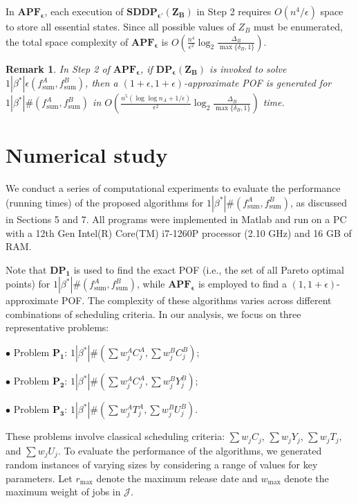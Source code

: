 \documentclass[12pt]{article}
\newtheorem{rem}{Remark}[section]
\begin{document}
\begin{sloppypar}
In $\mathbf{APF_{\epsilon}}$, each execution of $\mathbf{SDDP_{\epsilon'}(Z_B)}$ in Step 2 requires $O(n^4 /\epsilon)$ space to store all essential states. Since all possible values of $Z_B$ must be enumerated, the total space complexity of $\mathbf{APF_{\epsilon}}$ is $O(\frac{n^4}{\epsilon^2} \log_2 \frac{\Delta_B}{\max\{\delta_B,1\}})$.

\begin{rem} \label{R-7.3}
In Step 2 of $\mathbf{APF_{\epsilon}}$, if $\mathbf{DP_{\epsilon}(Z_B)}$ is invoked to solve $1 | \beta^{*}|\epsilon(f_{\mathrm{sum}}^A, f_{\mathrm{sum}}^B)$, then a $(1+\epsilon, 1+\epsilon)$-approximate POF is generated for $1 |\beta^{*}|\#(f_{\mathrm{sum}}^A, f_{\mathrm{sum}}^B)$ in $O(\frac{n^5(\log \log n_A+ 1/\epsilon)}{\epsilon^2} \log_2 \frac{\Delta_B}{\max\{\delta_B,1\}})$ time.
\end{rem}

\section{Numerical study}
We conduct a series of computational experiments to evaluate the performance (running times) of the proposed algorithms for $1 |\beta^{*}|\#(f_{\mathrm{sum}}^A, f_{\mathrm{sum}}^B)$, as discussed in Sections 5 and 7. All programs were implemented in Matlab and run on a PC with a 12th Gen Intel(R) Core(TM) i7-1260P processor (2.10 GHz) and 16 GB of RAM. 

Note that $\mathbf{DP_1}$ is used to find the exact POF (i.e., the set of all Pareto optimal points) for $1 | \beta^{*}|\#(f_{\mathrm{sum}}^A, f_{\mathrm{sum}}^B)$, while $\mathbf{APF_{\epsilon}}$ is employed to find a $(1, 1+\epsilon)$-approximate POF. The complexity of these algorithms varies across different combinations of scheduling criteria. In our analysis, we focus on three representative problems: 

$\bullet$ Problem $\mathbf{P_1}$: $1 | \beta^{*}|\#(\sum w_j^A C_j^A, \sum w_j^B C_j^B)$; 

$\bullet$ Problem $\mathbf{P_2}$: $1 | \beta^{*}|\#(\sum w_j^A C_j^A, \sum w_j^B Y_j^B)$;

$\bullet$ Problem $\mathbf{P_3}$: $1 | \beta^{*}|\#(\sum w_j^A T_j^A, \sum w_j^B U_j^B)$.

\noindent These problems involve classical scheduling criteria: $\sum w_j C_j$, $\sum w_j Y_j$, $\sum w_j T_j$, and $\sum w_j U_j$. To evaluate the performance of the algorithms, we generated random instances of varying sizes by considering a range of values for key parameters. Let $r_{\max}$ denote the maximum release date and $w_{\max}$ denote the maximum weight of jobs in $\mathcal{J}$.


\end{sloppypar}
\end{document}
